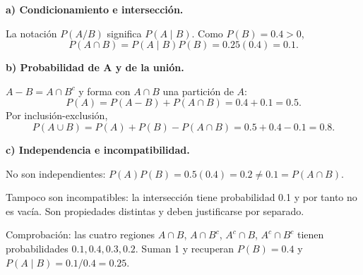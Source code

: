 \textbf{a) Condicionamiento e intersección.}\par\nopagebreak[4]
La notación $P(A/B)$ significa $P(A\mid B)$. Como $P(B)=0.4>0$,
\[
P(A\cap B)=P(A\mid B)P(B)=0.25(0.4)=\boxed{0.1}.
\]

\textbf{b) Probabilidad de A y de la unión.}\par\nopagebreak[4]
$A-B=A\cap B^c$ y forma con $A\cap B$ una partición de $A$:
\[
P(A)=P(A-B)+P(A\cap B)=0.4+0.1=\boxed{0.5}.
\]
Por inclusión-exclusión,
\[
P(A\cup B)=P(A)+P(B)-P(A\cap B)=0.5+0.4-0.1=\boxed{0.8}.
\]

\textbf{c) Independencia e incompatibilidad.}\par\nopagebreak[4]
No son independientes: $P(A)P(B)=0.5(0.4)=0.2\ne0.1=P(A\cap B)$.

Tampoco son incompatibles: la intersección tiene probabilidad 0.1 y por tanto no es vacía. Son propiedades distintas y deben justificarse por separado.

Comprobación: las cuatro regiones $A\cap B$, $A\cap B^c$, $A^c\cap B$, $A^c\cap B^c$ tienen probabilidades $0.1,0.4,0.3,0.2$. Suman 1 y recuperan $P(B)=0.4$ y $P(A\mid B)=0.1/0.4=0.25$.
